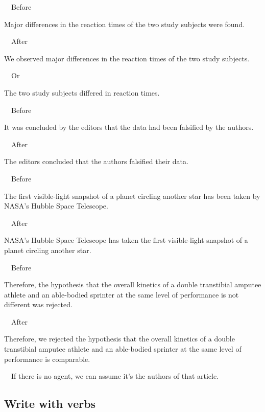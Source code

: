 \documentclass[a4paper, 12pt]{article}
\begin{document}
\par\ \textbullet\ Before
\par Major differences in the reaction times of the two study subjects were found.

\par\ \textbullet\ After
\par We observed major differences in the reaction times of the two study subjects.

\par\ \textbullet\ Or
\par The two study subjects differed in reaction times.

\par\ \textbullet\ Before
\par It was concluded by the editors that the data had been falsified by the authors.

\newpage\par\ \textbullet\ After
\par The editors concluded that the authors falsified their data.

\par\ \textbullet\ Before
\par The first visible-light snapshot of a planet circling another star has been taken by NASA’s Hubble Space Telescope.

\par\ \textbullet\ After
\par NASA's Hubble Space Telescope has taken the first visible-light snapshot of a planet circling another star.

\par\ \textbullet\ Before
\par Therefore, the hypothesis that the overall kinetics of a double transtibial amputee athlete and an able-bodied sprinter at the same level of performance is not different was rejected.

\par\ \textbullet\ After
\par Therefore, we rejected the hypothesis that the overall kinetics of a double transtibial amputee athlete and an able-bodied sprinter at the same level of performance is comparable.

\par\ \textbullet\ If there is no agent, we can assume it's the authors of that article.

\newpage\subsection{Write with verbs}
\end{document}
